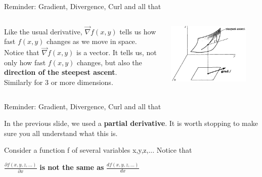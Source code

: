 {\begin{frame}{Reminder: Gradient, Divergence, Curl and all that}
\begin{columns}
  \begin{column}{0.50\textwidth}
    Like the usual derivative, $\vec\nabla f(x,y)$ tells us how fast $f(x,y)$ changes as we move in space.\\
    \vspace{0.1cm}
    Notice that $\vec\nabla f(x,y)$ is a vector.
    It tells us, not only how fast $f(x,y)$ changes, but also the {\bf direction of the steepest ascent}.\\
    \vspace{0.1cm}
    Similarly for 3 or more dimensions.
  \end{column}
  \begin{column}{0.50\textwidth}
   \begin{center}
     \includegraphics[width=0.85\textwidth]{./images/schematics/gradient_steepest_ascent.png}\\
   \end{center}
  \end{column}
\end{columns}

\end{frame}

%
%
%

\begin{frame}{Reminder: Gradient, Divergence, Curl and all that}

In the previous slide, we used a {\bf partial derivative}.
It is worth stopping to make sure you all understand what this is.
\vspace{0.1cm}

Consider a function f of several variables x,y,z,... Notice that\\
\begin{center}
{\color{red}
 {\Large
  $\frac{\partial f(x,y,z,...)}{\partial x}$
 }
 {\bf is not the same as}
 {\Large
  $\frac{df(x,y,z,...)}{dx}$\\
 }
}
\end{center}


\end{frame}}
